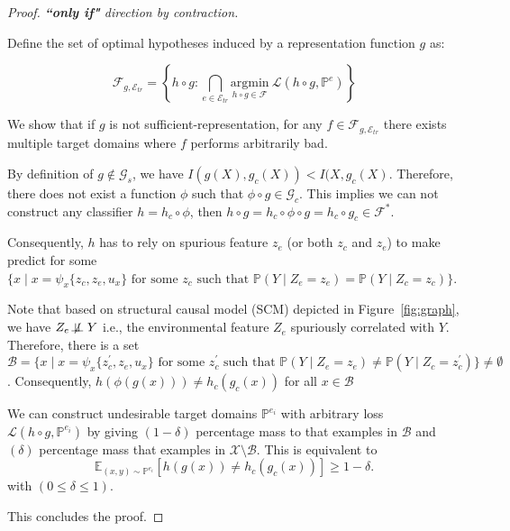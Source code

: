 \begin{proof} \textit{\textbf{``only if"} direction by contraction.} 

Define the set of optimal hypotheses induced by a representation function \( g \) as:

\begin{equation*}
\mathcal{F}_{g,\mathcal{E}_{tr}}=\left\{ h\circ g: \bigcap_{{e} \in \mathcal{E}_{tr}} \underset{h\circ g \in \mathcal{F}}{\text{argmin}} \ \mathcal{L}(h\circ g, \mathbb{P}^{e})\right \}
\end{equation*}  

We show that if $g$ is not sufficient-representation, for any $f\in\mathcal{F}_{g,\mathcal{E}_{tr}}$ there exists multiple target domains where $f$ performs arbitrarily bad.  


By definition of $g\notin \mathcal{G}_s$, we have
$I(g(X),g_c(X))<I(X,g_c(X)$. Therefore, there does not exist a function $\phi$ such that $\phi\circ g \in \mathcal{G}_c$. This implies we can not construct any classifier $h = h_c \circ \phi$, then $h \circ g =  h_c\circ \phi \circ g =h_c\circ g_c \in \mathcal{F}^*$.

Consequently, $h$ has to rely on spurious feature $z_e$ (or both $z_c$ and $z_e$) to make predict for some $\{x\mid x=\psi_x\{z_c,z_e, u_x\} \text{ for some } z_c \text{ such that } \mathbb{P}(Y\mid Z_e=z_e)= \mathbb{P}(Y\mid Z_c=z_c) \}$.  

Note that based on structural causal model (SCM) depicted in Figure~\ref{fig:graph}, we have $Z_e\not\!\perp\!\!\!\perp Y$ i.e., the environmental feature $Z_e$ spuriously correlated with $Y$. Therefore, there is a set $\mathcal{B}=\{x\mid x=\psi_x\{z^{'}_c, z_e, u_x\} \text{ for some } z^{'}_c \text{ such that } \mathbb{P}(Y\mid Z_e = z_e)\neq \mathbb{P}(Y\mid Z_c=z^{'}_c)\} \neq \emptyset$. Consequently, $h(\phi(g(x))) \neq h_c(g_c(x))$ for all $x\in \mathcal{B}$

    We can construct undesirable target domains $\mathbb{P}^{e_i}$ with arbitrary loss $\mathcal{L}(h\circ g, \mathbb{P}^{e_i})$ by giving $(1-\delta)$ percentage mass to that examples in $\mathcal{B}$ and $(\delta)$ percentage mass that examples in $\mathcal{X} \setminus \mathcal{B}$. This is equivalent to 
\begin{equation}
    \mathbb{E}_{(x,y)\sim\mathbb{P}^{e_i}} \left [ h(g(x)) \neq h_c(g_c(x))  \right ]  \geq 1-\delta.\nonumber
\end{equation}
 with $(0\leq\delta\leq 1)$.

This concludes the proof.

\end{proof}

